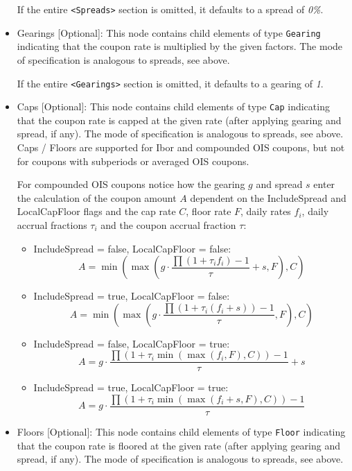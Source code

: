 \begin{itemize}
If the entire {\tt <Spreads>} section is omitted, it defaults to a spread of \emph{0\%}.

\item Gearings [Optional]: This node contains child elements of type \lstinline!Gearing! indicating that the coupon rate is
  multiplied by the given factors. The mode of specification is analogous to spreads, see above.
  
If the entire {\tt <Gearings>} section is omitted, it defaults to a gearing of \emph{1}.

\item Caps [Optional]: This node contains child elements of type \lstinline!Cap! indicating that the coupon rate is
  capped at the given rate (after applying gearing and spread, if any). The mode of specification is analogous to
  spreads, see above. Caps / Floors are supported for Ibor and compounded OIS coupons, but not for coupons with
  subperiods or averaged OIS coupons.

  For compounded OIS coupons notice how the gearing $g$ and spread $s$ enter the calculation of the coupon amount $A$
  dependent on the IncludeSpread and LocalCapFloor flags and the cap rate $C$, floor rate $F$, daily rates $f_i$, daily
  accrual fractions $\tau_i$ and the coupon accrual fraction $\tau$:
  \begin{itemize}
  \item IncludeSpread = false, LocalCapFloor = false:\\
    $$ A = \min \left( \max \left( g \cdot \frac{\prod (1 + \tau_i f_i) - 1}{\tau} + s, F \right), C \right)$$
  \item IncludeSpread = true, LocalCapFloor = false:\\
    $$ A = \min \left( \max \left( g \cdot \frac{\prod (1 + \tau_i(f_i + s)) - 1}{\tau}, F \right), C \right)$$
  \item IncludeSpread = false, LocalCapFloor = true:\\
    $$ A = g \cdot \frac{\prod (1 + \tau_i \min ( \max ( f_i , F), C)) - 1}{\tau} + s $$
  \item IncludeSpread = true, LocalCapFloor = true:\\
    $$ A = g \cdot \frac{\prod (1 + \tau_i \min ( \max ( f_i + s , F), C)) - 1}{\tau} $$
  \end{itemize}

\item Floors [Optional]: This node contains child elements of type \lstinline!Floor! indicating that the coupon rate is floored at
  the given rate (after applying gearing and spread, if any). The mode of specification is analogous to spreads, see
  above.


\end{itemize}
